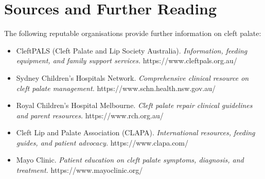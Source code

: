 \section*{Sources and Further Reading}
The following reputable organisations provide further information on cleft palate:
\begin{itemize}
    \item CleftPALS (Cleft Palate and Lip Society Australia). \textit{Information, feeding equipment, and family support services.} https://www.cleftpals.org.au/
    \item Sydney Children's Hospitals Network. \textit{Comprehensive clinical resource on cleft palate management.} https://www.schn.health.nsw.gov.au/
    \item Royal Children's Hospital Melbourne. \textit{Cleft palate repair clinical guidelines and parent resources.} https://www.rch.org.au/
    \item Cleft Lip and Palate Association (CLAPA). \textit{International resources, feeding guides, and patient advocacy.} https://www.clapa.com/
    \item Mayo Clinic. \textit{Patient education on cleft palate symptoms, diagnosis, and treatment.} https://www.mayoclinic.org/
\end{itemize}
